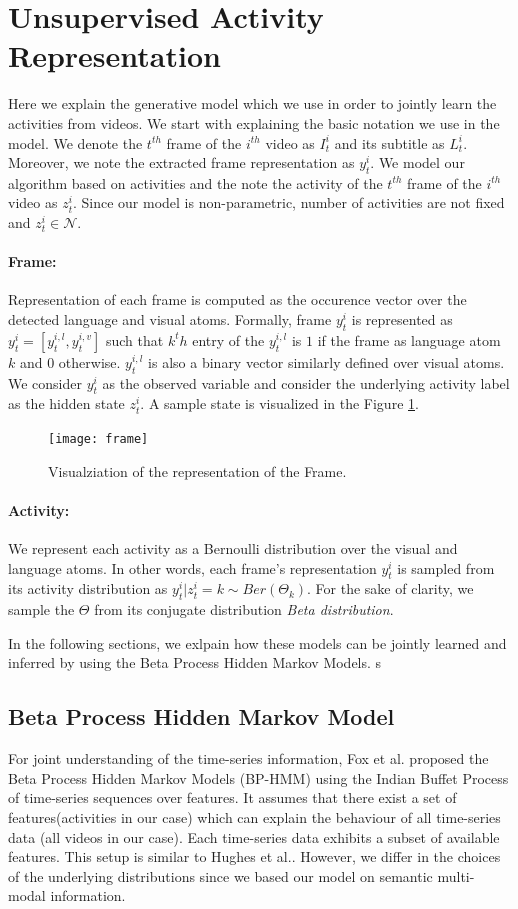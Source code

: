 \section{Unsupervised Activity Representation}
\label{basics}
Here we explain the generative model which we use in order to jointly learn the activities from videos. We start with explaining the basic notation we use in the model. We denote the $t^{th}$ frame of the $i^{th}$ video as $I^i_t$ and its subtitle as $L^i_t$. Moreover, we note the extracted frame representation as $y^i_t$. We model our algorithm based on activities and the note the activity of the $t^{th}$ frame of the $i^{th}$ video as $z^i_t$. Since our model is non-parametric, number of activities are not fixed and $z^i_t \in \mathcal{N}$.

\paragraph{Frame:} Representation of each frame is computed as the occurence vector over the detected language and visual atoms. Formally, frame $y^i_t$ is represented as $y^i_t=[y^{i,l}_t,y^{i,v}_t]$ such that $k^th$ entry of the $y^{i,l}_t$ is $1$ if the frame as language atom $k$ and $0$ otherwise. $y^{i,l}_t$ is also a binary vector similarly defined over visual atoms. We consider $y^i_t$ as the observed variable and consider the underlying activity label as the hidden state $z^i_t$. A sample state is visualized in the Figure \ref{visFrame}.

\begin{figure}
  \texttt{[image: frame]}
  \caption{Visualziation of the representation of the Frame.}
  \label{visFrame}
\end{figure}

\paragraph{Activity:} We represent each activity as a Bernoulli distribution over the visual and language atoms. In other words, each frame's representation $y^i_t$ is sampled from its activity distribution as $y^i_t|z^i_t=k \sim Ber(\Theta_k)$. For the sake of clarity, we sample the $\Theta$ from its conjugate distribution \emph{Beta distribution}.

In the following sections, we exlpain how these models can be jointly learned and inferred by using the Beta Process Hidden Markov Models.
s
\subsection{Beta Process Hidden Markov Model}
For joint understanding of the time-series information, Fox et al.\cite{foxBPHMM} proposed the Beta Process Hidden Markov Models (BP-HMM) using the Indian Buffet Process\cite{ibp} of time-series sequences over features. It assumes that there exist a set of features(activities in our case) which can explain the behaviour of all time-series data (all videos in our case). Each time-series data exhibits a subset of available features. This setup is similar to Hughes et al.\cite{npActivity}. However, we differ in the choices of the underlying distributions since we based our model on semantic multi-modal information.

